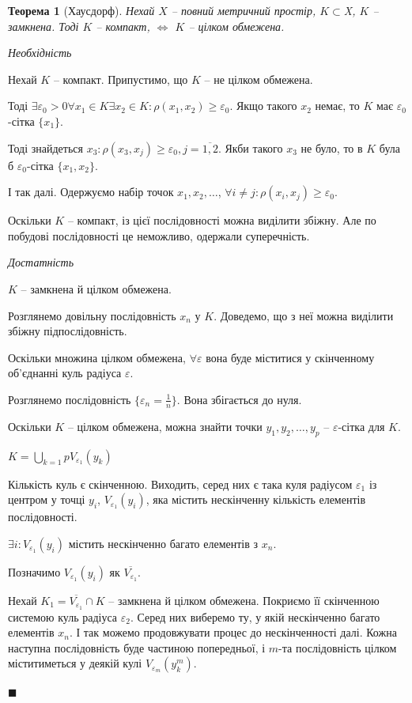 \documentclass[14pt,twoside]{extreport}
\theoremstyle{mystyle}
\newtheorem{thm}{Теорема}
\renewenvironment{proof}{{\bfseries Доведення.}}{$\blacksquare$}
\numberwithin{equation}{chapter}
\begin{document}
\begin{thm}[Хаусдорф]
	Нехай $X $ -- повний метричний простір, $K \subset $X$ $, $K$ -- замкнена. Тоді $K$ -- компакт, $\iff $ $K$ -- цілком обмежена.
\end{thm}
\begin{proof}
	
	\emph{Необхідність}
	
	Нехай $K$ -- компакт.
	Припустимо, що $K $ -- не цілком обмежена.
	
	Тоді $\exists \varepsilon_0 > 0 \forall x_1 \in K \exists x_2 \in K:  \rho(x_1, x_2) \ge \varepsilon_0 $. Якщо такого $x_2$ немає, то $K$ має $\varepsilon_0 $-сітка $\{x_1\}$.
	
	Тоді знайдеться $x_3: \rho(x_3, x_j) \ge \varepsilon_0, j = \overline{1, 2} $. Якби такого $x_3 $ не було, то в $K$ була б $\varepsilon_0$-сітка $\{x_1, x_2\} $.
	
	І так далі. Одержуємо набір точок $x_1, x_2, \ldots $, $\forall i \ne j:  \rho(x_i, x_j) \geqslant \varepsilon_0 $.
	
	Оскільки $K$ -- компакт, із цієї послідовності можна виділити збіжну. Але по побудові послідовності це неможливо, одержали суперечність.
	
	\emph{Достатність}
	
	$K$ -- замкнена й цілком обмежена.
	
	Розглянемо довільну послідовність $x_n$ у $K$. Доведемо, що з неї можна виділити збіжну підпослідовність.
	
	Оскільки множина цілком обмежена, $\forall \varepsilon$ вона буде міститися у скінченному об'єднанні куль радіуса $\varepsilon$.
	
	Розглянемо послідовність $\{\varepsilon_n = \frac 1 n \}$. Вона збігається до нуля.
	
	Оскільки $K$ -- цілком обмежена, можна знайти точки $y_1, y_2, \ldots, y_p $ -- $\varepsilon$-сітка для $K$.
	
	$K = \bigcup\limits_{k = 1}p V_{\varepsilon_1}(y_k)$
	
	Кількість куль є скінченною. Виходить, серед них є така куля радіусом $\varepsilon_1$ із центром у точці $y_i$, $V_{\varepsilon_1}(y_i)$, яка містить нескінченну кількість елементів послідовності.
	
	$\exists i: V_{\varepsilon_1}(y_i)$ містить нескінченно багато елементів з $x_n$.
	
	Позначимо $V_{\varepsilon_1}(y_i) $ як $\overline{V_{\varepsilon_1}} $.
	
	Нехай $K_1 = \overline{V_{\varepsilon_1}} \cap K$ -- замкнена й цілком обмежена. Покриємо її скінченною системою куль радіуса $\varepsilon_2$. Серед них виберемо ту, у якій нескінченно багато елементів $x_n$. І так можемо продовжувати процес до нескінченності далі. Кожна наступна послідовність буде частиною попередньої, і $m$-та послідовність цілком міститиметься у деякій кулі $V_{\varepsilon_m}(y_k^m)$.
	

\end{proof}
\end{document}
